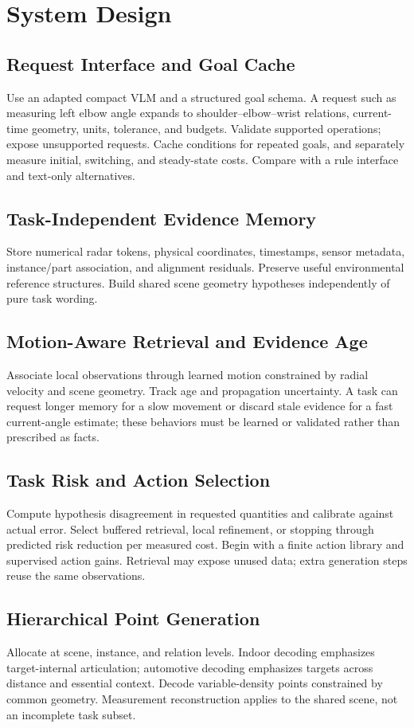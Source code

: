 \section{System Design}
\label{sec:design}
\subsection{Request Interface and Goal Cache}
Use an adapted compact VLM and a structured goal schema. A request such as measuring left elbow angle expands to shoulder--elbow--wrist relations, current-time geometry, units, tolerance, and budgets. Validate supported operations; expose unsupported requests. Cache conditions for repeated goals, and separately measure initial, switching, and steady-state costs. Compare with a rule interface and text-only alternatives.

\subsection{Task-Independent Evidence Memory}
Store numerical radar tokens, physical coordinates, timestamps, sensor metadata, instance/part association, and alignment residuals. Preserve useful environmental reference structures. Build shared scene geometry hypotheses independently of pure task wording.

\subsection{Motion-Aware Retrieval and Evidence Age}
Associate local observations through learned motion constrained by radial velocity and scene geometry. Track age and propagation uncertainty. A task can request longer memory for a slow movement or discard stale evidence for a fast current-angle estimate; these behaviors must be learned or validated rather than prescribed as facts.

\subsection{Task Risk and Action Selection}
Compute hypothesis disagreement in requested quantities and calibrate against actual error. Select buffered retrieval, local refinement, or stopping through predicted risk reduction per measured cost. Begin with a finite action library and supervised action gains. Retrieval may expose unused data; extra generation steps reuse the same observations.

\subsection{Hierarchical Point Generation}
Allocate at scene, instance, and relation levels. Indoor decoding emphasizes target-internal articulation; automotive decoding emphasizes targets across distance and essential context. Decode variable-density points constrained by common geometry. Measurement reconstruction applies to the shared scene, not an incomplete task subset.

